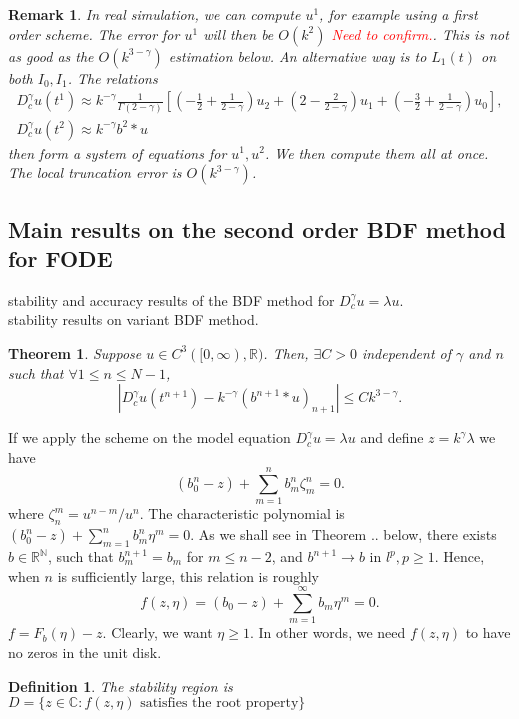 \documentclass[11pt]{article} %
\newcommand{\tcr}[1]{\textcolor{red}{#1}}
\newtheorem{thm}{Theorem}
\newtheorem{rmk}{Remark}
\newtheorem{defi}{Definition}
\begin{document}
\begin{rmk}
In real simulation, we can compute $u^1$, for example using a first order scheme. The error for $u^1$ will then be $O(k^2)$ \tcr{Need to confirm.}. This is not as good as the $O(k^{3-\gamma})$ estimation below. An alternative way is to $L_1(t)$ on both $I_0, I_1$. The relations 
\begin{gather*}
D_c^{\gamma}u(t^1)\approx k^{-\gamma}\frac{1}{\Gamma(2-\gamma)}[(-\frac{1}{2}
+\frac{1}{2-\gamma})u_2+(2-\frac{2}{2-\gamma})u_1+(-\frac{3}{2}+\frac{1}{2-\gamma})u_0],\\
D_c^{\gamma}u(t^2)\approx k^{-\gamma}b^{2}*u
\end{gather*}
then form a system of equations for $u^1, u^2$. We then compute them all at once. The local truncation error is $O(k^{3-\gamma})$.
\end{rmk}

\subsection{Main results on the second order BDF method for FODE}
stability and accuracy results of the BDF method for $D^\gamma_c u = \lambda u$. \\
stability results on variant BDF method.

\begin{thm}
Suppose $u\in C^3([0,\infty), \mathbb{R})$. Then, $\exists C>0$ independent of $\gamma$ and $n$ such that $\forall 1\le  n\le N-1$, $$
|D_c^{\gamma}u(t^{n+1})-k^{-\gamma}(b^{n+1}*u)_{n+1}|\le Ck^{3-\gamma}.
$$
\end{thm}

If we apply the scheme on the model equation $D_c^{\gamma}u=\lambda u$ and define $z=k^{\gamma}\lambda$
we have  $$
(b_0^n-z)+\sum_{m=1}^n b_m^n \zeta^n_m=0.
$$
where $\zeta^m_n=u^{n-m}/u^n$. The characteristic polynomial is $(b_0^n-z)+\sum_{m=1}^n b_m^n \eta^m=0.$
As we shall see in Theorem .. below, there exists $b\in\mathbb{R}^{\mathbb{N}}$, such that $b^{n+1}_m=b_m$ for $m\le n-2$, and $b^{n+1}\to b$ in $l^p, p\ge 1$. Hence, when $n$ is sufficiently large, this relation is roughly 
$$
f(z, \eta)=(b_0-z)+\sum_{m=1}^{\infty} b_m \eta^m=0.
$$
$f=F_b(\eta)-z$. Clearly, we want $\eta\ge 1$. In other words, we need $f(z, \eta)$ to have no zeros in the unit disk. 

\begin{defi}
The stability region is $D=\{z\in\mathbb{C}: f(z, \eta)\text{ satisfies the root property}\}$
\end{defi}
\end{document}
